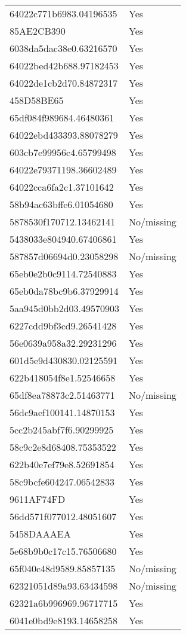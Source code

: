 \begin{tabular}{ll}
64022c771b6983.04196535 & Yes \\
85AE2CB390 & Yes \\
6038da5dac38e0.63216570 & Yes \\
64022bed42b688.97182453 & Yes \\
64022de1cb2d70.84872317 & Yes \\
458D58BE65 & Yes \\
65df084f989684.46480361 & Yes \\
64022ebd433393.88078279 & Yes \\
603cb7e99956c4.65799498 & Yes \\
64022e79371198.36602489 & Yes \\
64022cca6fa2c1.37101642 & Yes \\
58b94ac63bffe6.01054680 & Yes \\
5878530f170712.13462141 & No/missing \\
5438033e804940.67406861 & Yes \\
587857d06694d0.23058298 & No/missing \\
65eb0e2b0c9114.72540883 & Yes \\
65eb0da78bc9b6.37929914 & Yes \\
5aa945d0bb2d03.49570903 & Yes \\
6227cdd9bf3cd9.26541428 & Yes \\
56e0639a958a32.29231296 & Yes \\
601d5e9d430830.02125591 & Yes \\
622b418054f8e1.52546658 & Yes \\
65df8ea78873c2.51463771 & No/missing \\
56dc9aef100141.14870153 & Yes \\
5cc2b245abf7f6.90299925 & Yes \\
58c9c2e8d68408.75353522 & Yes \\
622b40e7ef79e8.52691854 & Yes \\
58c9bcfe604247.06542833 & Yes \\
9611AF74FD & Yes \\
56dd571f077012.48051607 & Yes \\
5458DAAAEA & Yes \\
5e68b9b0c17c15.76506680 & Yes \\
65f040c48d9589.85857135 & No/missing \\
62321051d89a93.63434598 & No/missing \\
62321a6b996969.96717715 & Yes \\
6041e0bd9e8193.14658258 & Yes \\

\end{tabular}
